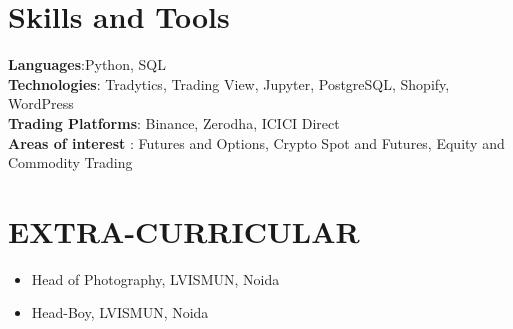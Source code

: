 \documentclass[letterpaper,11pt]{article}
\newcommand{\achievementItem}[1]{
  \item\small{
    {#1 \vspace{-6pt}}
  }
}
\begin{document}
 
\section{Skills and Tools}
 \begin{itemize}[leftmargin=0.15in, label={}]
    \small{\item{
     \textbf{Languages}{:Python, SQL} \\
     \vspace{1pt}
     \textbf{Technologies}{: Tradytics, Trading View, Jupyter, PostgreSQL, Shopify, WordPress} \\
     \vspace{1pt}
     \textbf{Trading Platforms}{: Binance, Zerodha, ICICI Direct} \\
     \vspace{1pt}
     \textbf{Areas of interest }{: Futures and Options, Crypto Spot and Futures, Equity and Commodity Trading} \\
     \vspace{1pt}
    
    }}
 \end{itemize}



\section{EXTRA-CURRICULAR}

\begin{itemize}[leftmargin=0.2in]

  \achievementItem{Head of Photography, LVISMUN, Noida}
  \achievementItem{Head-Boy, LVISMUN, Noida}

\end{itemize}
\end{document}
